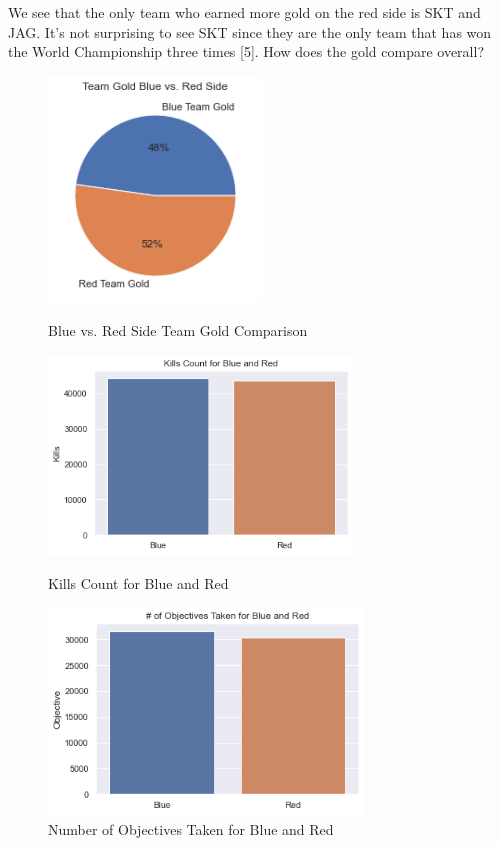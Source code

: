 \documentclass[conference]{IEEEtran}
\begin{document}
We see that the only team who earned more gold on the red side is SKT and JAG. It's not surprising to see SKT since they are the only team that has won the World Championship three times [5]. How does the gold compare overall?

\begin{figure}[!ht]
  \begin{center}
 \includegraphics[height=6cm]{graphics/BvR_g.png}
 \caption{Blue vs. Red Side Team Gold Comparison}
 \label{Blue vs. Red Side Team Gold Comparison}
 \end{center}

  \begin{center}
 \includegraphics[height=5.3cm]{graphics/Kills.png}
 \caption{Kills Count for Blue and Red}
 \label{Kills Count for Blue and Red}
 \end{center}

  \begin{center}
 \includegraphics[height=5.5cm]{graphics/obj.png}
 \caption{ Number of Objectives Taken for Blue and Red}
 \label{Number of Objectives Taken for Blue and Red}
 \end{center}
\end{figure}
\end{document}
